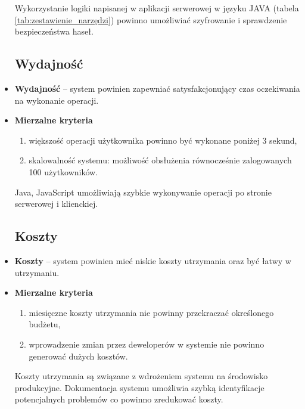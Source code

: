 \begin{itemize}
		Wykorzystanie logiki napisanej w aplikacji serwerowej w języku JAVA (tabela \ref{tab:zestawienie_narzędzi}) powinno umożliwiać szyfrowanie i sprawdzenie bezpieczeństwa haseł.
		
		\subsection{Wydajność}
		\item \textbf{Wydajność} -- system powinien zapewniać satysfakcjonujący czas oczekiwania na wykonanie operacji.
	\item \textbf{Mierzalne kryteria}
		\begin{enumerate}
			\item większość operacji użytkownika powinno być wykonane poniżej 3 sekund,
			\item skalowalność systemu: możliwość obsłużenia równocześnie zalogowanych 100 użytkowników.
		\end{enumerate}
		
		Java, JavaScript umożliwiają szybkie wykonywanie operacji po stronie serwerowej i klienckiej.
		
		\subsection{Koszty}
	\item \textbf{Koszty} -- system powinien mieć niskie koszty utrzymania oraz być łatwy w utrzymaniu.
	\item \textbf{Mierzalne kryteria}
		\begin{enumerate}
			\item miesięczne koszty utrzymania nie powinny przekraczać określonego budżetu,
			\item wprowadzenie zmian przez deweloperów w systemie nie powinno generować dużych kosztów.
		\end{enumerate}
		
	Koszty utrzymania są związane z wdrożeniem systemu na środowisko produkcyjne. Dokumentacja systemu umożliwia szybką identyfikacje potencjalnych problemów co powinno zredukować koszty.
\end{itemize}
 









